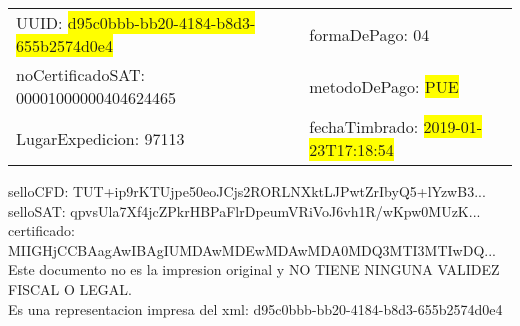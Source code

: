 \documentclass{article}
\begin{document}
\begin{tabular}{p{11cm}p{1cm}p{8cm}}
\bigskip
UUID: \colorbox{yellow}{ d95c0bbb-bb20-4184-b8d3-655b2574d0e4 } & & formaDePago: 04\\

noCertificadoSAT: 00001000000404624465 & & metodoDePago: \colorbox{yellow}{ PUE }\\

LugarExpedicion: 97113 & & fechaTimbrado: \colorbox{yellow}{ 2019-01-23T17:18:54 } \\
\end{tabular}

\bigskip
selloCFD: TUT+ip9rKTUjpe50eoJCjs2RORLNXktLJPwtZrIbyQ5+lYzwB3... \\
selloSAT: qpvsUla7Xf4jcZPkrHBPaFlrDpeumVRiVoJ6vh1R/wKpw0MUzK... \\

certificado: MIIGHjCCBAagAwIBAgIUMDAwMDEwMDAwMDA0MDQ3MTI3MTIwDQ...\bigskip\bigskip\bigskip\bigskip\bigskip\bigskip
\\Este documento no es la impresion original y NO TIENE NINGUNA VALIDEZ FISCAL O LEGAL. \\
 Es una representacion impresa del xml:  d95c0bbb-bb20-4184-b8d3-655b2574d0e4 \\
\end{document}

